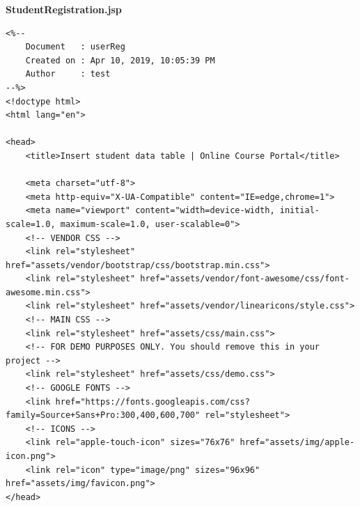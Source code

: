 {\bf StudentRegistration.jsp}
\begin{lstlisting}
<%-- 
    Document   : userReg
    Created on : Apr 10, 2019, 10:05:39 PM
    Author     : test
--%>
<!doctype html>
<html lang="en">

<head>
	<title>Insert student data table | Online Course Portal</title>
        
	<meta charset="utf-8">
	<meta http-equiv="X-UA-Compatible" content="IE=edge,chrome=1">
	<meta name="viewport" content="width=device-width, initial-scale=1.0, maximum-scale=1.0, user-scalable=0">
	<!-- VENDOR CSS -->
	<link rel="stylesheet" href="assets/vendor/bootstrap/css/bootstrap.min.css">
	<link rel="stylesheet" href="assets/vendor/font-awesome/css/font-awesome.min.css">
	<link rel="stylesheet" href="assets/vendor/linearicons/style.css">
	<!-- MAIN CSS -->
	<link rel="stylesheet" href="assets/css/main.css">
	<!-- FOR DEMO PURPOSES ONLY. You should remove this in your project -->
	<link rel="stylesheet" href="assets/css/demo.css">
	<!-- GOOGLE FONTS -->
	<link href="https://fonts.googleapis.com/css?family=Source+Sans+Pro:300,400,600,700" rel="stylesheet">
	<!-- ICONS -->
	<link rel="apple-touch-icon" sizes="76x76" href="assets/img/apple-icon.png">
	<link rel="icon" type="image/png" sizes="96x96" href="assets/img/favicon.png">
</head>


\end{lstlisting}
